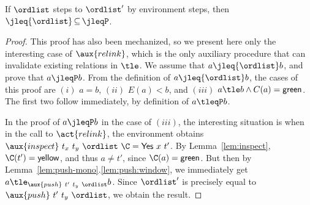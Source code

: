 

\begin{lemma}\label{lem:jleq-stable}
If $\ordlist$ steps to $\ordlist'$ by environment steps, then
$\jleq{\ordlist}\,{\subseteq}\,\jleqP$.
\end{lemma}

\begin{proof}
This proof has also been mechanized, so we present here only the
interesting case of $\aux{relink}$, which is the only auxiliary
procedure that can invalidate existing relations in $\tle$. We assume
that $a \jleq{\ordlist} b$, and prove that $a \jleqP b$. From the definition of
$a \jleq{\ordlist} b$, the cases of this proof are $(i)$ $a = b$, $(ii)$ $E(a) <
b$, and $(iii)$ $a \tle b \wedge C(a)=\mathsf{green}$. The first two
follow immediately, by definition of $a \tleqP b$.

In the proof of $a \jleqP b$ in the case of $(iii)$, the interesting
situation is when in the call to $\act{relink}$, the environment
obtains $\aux{inspect}\ t_x\ t_y\ \ordlist\ \C =
\mathsf{Yes}\ x\ t'$. By Lemma~\ref{lem:inspect}, $\C(t') =
\mathsf{yellow}$, and thus $a \neq t'$, since
$\C(a)=\mathsf{green}$. But then by
Lemma~\ref{lem:push-mono}.\ref{lem:push:window}, we immediately get $a
\tle_{\aux{push}\ t'\ t_y\ \ordlist} b$.  Since $\ordlist'$ is
precisely equal to $\aux{push}\ t'\ t_y\ \ordlist$, we obtain the
result.
\end{proof}

%

